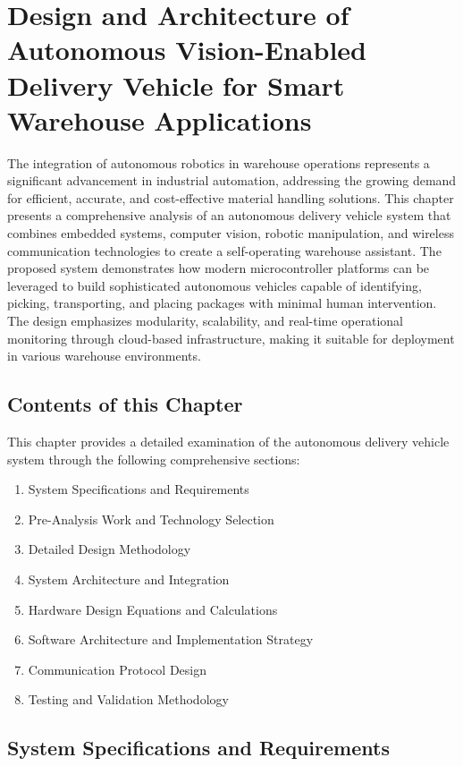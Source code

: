 
\chapter{Design and Architecture of Autonomous Vision-Enabled Delivery Vehicle for Smart Warehouse Applications}

The integration of autonomous robotics in warehouse operations represents a significant advancement in industrial automation, addressing the growing demand for efficient, accurate, and cost-effective material handling solutions. This chapter presents a comprehensive analysis of an autonomous delivery vehicle system that combines embedded systems, computer vision, robotic manipulation, and wireless communication technologies to create a self-operating warehouse assistant. The proposed system demonstrates how modern microcontroller platforms can be leveraged to build sophisticated autonomous vehicles capable of identifying, picking, transporting, and placing packages with minimal human intervention. The design emphasizes modularity, scalability, and real-time operational monitoring through cloud-based infrastructure, making it suitable for deployment in various warehouse environments.

\section{Contents of this Chapter}
This chapter provides a detailed examination of the autonomous delivery vehicle system through the following comprehensive sections:
\begin{enumerate}
\item System Specifications and Requirements
\item Pre-Analysis Work and Technology Selection
\item Detailed Design Methodology
\item System Architecture and Integration
\item Hardware Design Equations and Calculations
\item Software Architecture and Implementation Strategy
\item Communication Protocol Design
\item Testing and Validation Methodology
\end{enumerate}

\section{System Specifications and Requirements}

